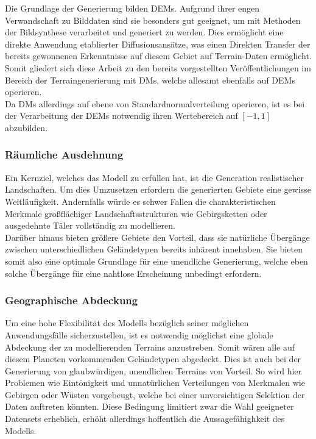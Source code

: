 Die Grundlage der Generierung bilden DEMs. Aufgrund ihrer engen Verwandschaft zu Bilddaten sind sie besonders gut geeignet, um mit Methoden der Bildsynthese verarbeitet und generiert zu werden. Dies ermöglicht eine direkte Anwendung etablierter Diffusionsansätze, was einen Direkten Transfer der bereits gewonnenen Erkenntnisse auf diesem Gebiet auf Terrain-Daten ermöglicht. Somit  gliedert sich diese Arbeit zu den bereits vorgestellten Veröffentlichungen im Bereich der Terraingenerierung mit DMs, welche allesamt ebenfalls auf DEMs operieren. \\
Da DMs allerdings auf ebene von Standardnormalverteilung operieren, ist es bei der Verarbeitung der DEMs notwendig ihren Wertebereich auf $[-1,1]$ abzubilden.

\subsubsection {Räumliche Ausdehnung}

Ein Kernziel, welches das Modell zu erfüllen hat, ist die Generation realistischer Landschaften. Um dies Umzusetzen erfordern die generierten Gebiete eine gewisse Weitläufigkeit. Andernfalls würde es schwer Fallen die charakteristischen Merkmale großflächiger Landschaftsstrukturen wie Gebirgsketten oder ausgedehnte Täler vollständig zu modellieren. \\
Darüber hinaus bieten größere Gebiete den Vorteil, dass sie natürliche Übergänge zwischen unterschiedlichen Geländetypen bereits inhärent innehaben. Sie bieten somit also eine optimale Grundlage für eine unendliche Generierung, welche eben solche Übergänge für eine nahtlose Erscheinung unbedingt erfordern.  

\subsubsection {Geographische Abdeckung}
\label{subsubsec:Geographische_Abdeckung}

Um eine hohe Flexibilität des Modells bezüglich seiner möglichen Anwendungsfälle sicherzustellen, ist es notwendig möglichst eine globale Abdeckung der zu modellierenden Terrains anzustreben. Somit wären alle auf diesem Planeten vorkommenden Geländetypen abgedeckt. Dies ist auch bei der Generierung von glaubwürdigen, unendlichen Terrains von Vorteil. So wird hier Problemen wie Eintönigkeit und unnatürlichen Verteilungen von Merkmalen wie Gebirgen oder Wüsten vorgebeugt, welche bei einer unvorsichtigen Selektion der Daten auftreten könnten. Diese Bedingung limitiert zwar die Wahl geeigneter Datensets erheblich, erhöht allerdings hoffentlich die Aussagefähighkeit des Modells.  

